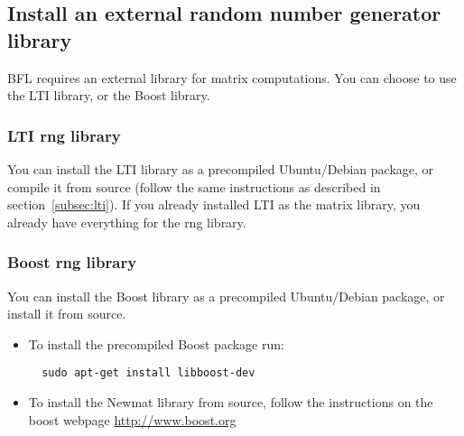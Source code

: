 \documentclass[a4paper,10pt]{article}
\begin{document}
\subsection{Install an external random number generator library}
BFL requires an external library for matrix computations. You can
choose to use the LTI library, or the Boost library.

\subsubsection{LTI rng library}
You can install the LTI library as a precompiled Ubuntu/Debian
package, or compile it from source (follow the same instructions as
described in section~\ref{subsec:lti}). If you already installed LTI
as the matrix library, you already have everything for the rng library.

\subsubsection{Boost rng library}
You can install the Boost library as a precompiled Ubuntu/Debian
package, or install it from source.
\begin{itemize}
\item To install the precompiled Boost package run:
\begin{verbatim}
  sudo apt-get install libboost-dev
\end{verbatim}
\item To install the Newmat library from source, follow the
  instructions on the boost webpage \url{http://www.boost.org}
\end{itemize}
\end{document}
